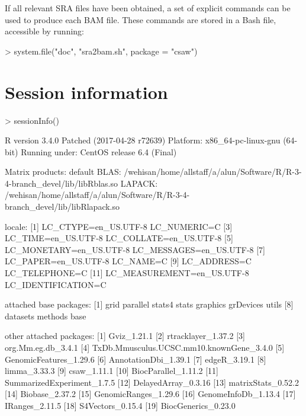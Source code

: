 \documentclass[12pt]{report}
\renewenvironment{Schunk}{\vspace{0pt}}{\vspace{0pt}}
\begin{document}
If all relevant SRA files have been obtained, a set of explicit commands can be used to produce each BAM file.
These commands are stored in a Bash file, accessible by running:

\begin{Schunk}
\begin{Sinput}
> system.file("doc", "sra2bam.sh", package = "csaw")
\end{Sinput}
\end{Schunk}

\section{Session information}
\begin{Schunk}
\begin{Sinput}
> sessionInfo()
\end{Sinput}
\begin{Soutput}
R version 3.4.0 Patched (2017-04-28 r72639)
Platform: x86_64-pc-linux-gnu (64-bit)
Running under: CentOS release 6.4 (Final)

Matrix products: default
BLAS: /wehisan/home/allstaff/a/alun/Software/R/R-3-4-branch_devel/lib/libRblas.so
LAPACK: /wehisan/home/allstaff/a/alun/Software/R/R-3-4-branch_devel/lib/libRlapack.so

locale:
 [1] LC_CTYPE=en_US.UTF-8       LC_NUMERIC=C              
 [3] LC_TIME=en_US.UTF-8        LC_COLLATE=en_US.UTF-8    
 [5] LC_MONETARY=en_US.UTF-8    LC_MESSAGES=en_US.UTF-8   
 [7] LC_PAPER=en_US.UTF-8       LC_NAME=C                 
 [9] LC_ADDRESS=C               LC_TELEPHONE=C            
[11] LC_MEASUREMENT=en_US.UTF-8 LC_IDENTIFICATION=C       

attached base packages:
 [1] grid      parallel  stats4    stats     graphics  grDevices utils    
 [8] datasets  methods   base     

other attached packages:
 [1] Gviz_1.21.1                             
 [2] rtracklayer_1.37.2                      
 [3] org.Mm.eg.db_3.4.1                      
 [4] TxDb.Mmusculus.UCSC.mm10.knownGene_3.4.0
 [5] GenomicFeatures_1.29.6                  
 [6] AnnotationDbi_1.39.1                    
 [7] edgeR_3.19.1                            
 [8] limma_3.33.3                            
 [9] csaw_1.11.1                             
[10] BiocParallel_1.11.2                     
[11] SummarizedExperiment_1.7.5              
[12] DelayedArray_0.3.16                     
[13] matrixStats_0.52.2                      
[14] Biobase_2.37.2                          
[15] GenomicRanges_1.29.6                    
[16] GenomeInfoDb_1.13.4                     
[17] IRanges_2.11.5                          
[18] S4Vectors_0.15.4                        
[19] BiocGenerics_0.23.0                     


\end{Soutput}
\end{Schunk}
\end{document}
